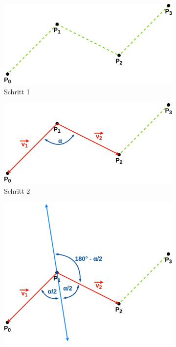 \documentclass[doktyp=studarbeit]{TUBAFarbeiten}
\begin{document}
\begin{figure}[!htb]
    \centering
    \begin{subfigure}[b]{0.35\textwidth}
        \centering
        \includegraphics[width=1\linewidth]{Schlangenlinie-1.png}
        \caption{Schritt 1}
    \end{subfigure}
    \qquad
    \begin{subfigure}[b]{0.35\textwidth}
        \centering
        \includegraphics[width=1\linewidth]{Schlangenlinie-2.png}
        \caption{Schritt 2}
    \end{subfigure}
    \qquad
    \begin{subfigure}[b]{0.35\textwidth}
        \centering
        \includegraphics[width=1\linewidth]{Schlangenlinie-3.png}

\end{subfigure}
\end{figure}
\end{document}
